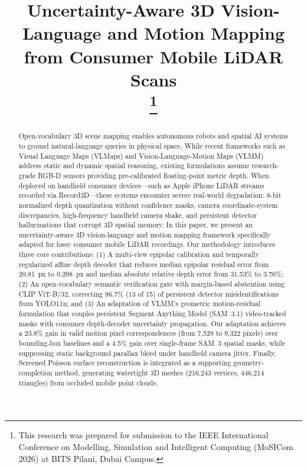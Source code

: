 \documentclass[conference]{IEEEtran}
\begin{document}
\title{Uncertainty-Aware 3D Vision-Language and Motion Mapping from Consumer Mobile LiDAR Scans\\
\thanks{This research was prepared for submission to the IEEE International Conference on Modelling, Simulation and Intelligent Computing (MoSICom 2026) at BITS Pilani, Dubai Campus.}
}

\author{
}

\maketitle

\begin{abstract}
Open-vocabulary 3D scene mapping enables autonomous robots and spatial AI systems to ground natural-language queries in physical space. While recent frameworks such as Visual Language Maps (VLMaps) and Vision-Language-Motion Maps (VLMM) address static and dynamic spatial reasoning, existing formulations assume research-grade RGB-D sensors providing pre-calibrated floating-point metric depth. When deployed on handheld consumer devices---such as Apple iPhone LiDAR streams recorded via Record3D---these systems encounter severe real-world degradation: 8-bit normalized depth quantization without confidence masks, camera coordinate-system discrepancies, high-frequency handheld camera shake, and persistent detector hallucinations that corrupt 3D spatial memory. In this paper, we present an uncertainty-aware 3D vision-language and motion mapping framework specifically adapted for lossy consumer mobile LiDAR recordings. Our methodology introduces three core contributions: (1) A multi-view epipolar calibration and temporally regularized affine depth decoder that reduces median epipolar residual error from 20.81~px to 0.298~px and median absolute relative depth error from 31.53\% to 3.76\%; (2) An open-vocabulary semantic verification gate with margin-based abstention using CLIP ViT-B/32, correcting 86.7\% (13 of 15) of persistent detector misidentifications from YOLO11n; and (3) An adaptation of VLMM's geometric motion-residual formulation that couples persistent Segment Anything Model (SAM~3.1) video-tracked masks with consumer depth-decoder uncertainty propagation. Our adaptation achieves a 23.8\% gain in valid motion pixel correspondences (from 7,529 to 9,322 pixels) over bounding-box baselines and a 4.5\% gain over single-frame SAM~3 spatial masks, while suppressing static background parallax bleed under handheld camera jitter. Finally, Screened Poisson surface reconstruction is integrated as a supporting geometry-completion method, generating watertight 3D meshes (216,243 vertices, 446,214 triangles) from occluded mobile point clouds.
\end{abstract}
\end{document}

